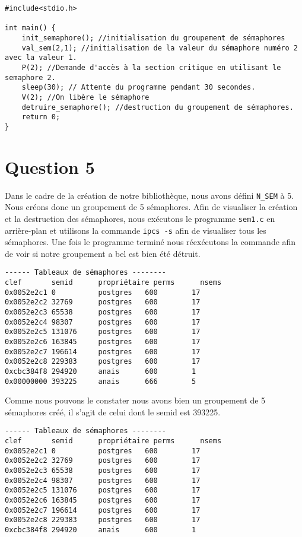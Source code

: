 \begin{lstlisting}
#include<stdio.h>

int main() {
    init_semaphore(); //initialisation du groupement de sémaphores
    val_sem(2,1); //initialisation de la valeur du sémaphore numéro 2 avec la valeur 1.
    P(2); //Demande d'accès à la section critique en utilisant le semaphore 2.
    sleep(30); // Attente du programme pendant 30 secondes.
    V(2); //On libère le sémaphore
    detruire_semaphore(); //destruction du groupement de sémaphores.
    return 0;
}
\end{lstlisting}

\section{Question 5}
Dans le cadre de la création de notre bibliothèque, nous avons défini \lstinline{N_SEM} à 5. Nous créons donc un groupement de 5 sémaphores. Afin de visualiser la création et la destruction des sémaphores, nous exécutons le programme \lstinline{sem1.c} en arrière-plan et utilisons la commande \lstinline{ipcs -s} afin de visualiser tous les sémaphores. Une fois le programme terminé nous réexécutons la commande afin de voir si notre groupement a bel est bien été détruit.

\begin{lstlisting}
------ Tableaux de sémaphores --------
clef       semid      propriétaire perms      nsems     
0x0052e2c1 0          postgres   600        17        
0x0052e2c2 32769      postgres   600        17        
0x0052e2c3 65538      postgres   600        17        
0x0052e2c4 98307      postgres   600        17        
0x0052e2c5 131076     postgres   600        17        
0x0052e2c6 163845     postgres   600        17        
0x0052e2c7 196614     postgres   600        17        
0x0052e2c8 229383     postgres   600        17        
0xcbc384f8 294920     anais      600        1         
0x00000000 393225     anais      666        5 
\end{lstlisting}

Comme nous pouvons le constater nous avons bien un groupement de 5 sémaphores créé, il s'agit de celui dont le semid est 393225.

\begin{lstlisting}
------ Tableaux de sémaphores --------
clef       semid      propriétaire perms      nsems     
0x0052e2c1 0          postgres   600        17        
0x0052e2c2 32769      postgres   600        17        
0x0052e2c3 65538      postgres   600        17        
0x0052e2c4 98307      postgres   600        17        
0x0052e2c5 131076     postgres   600        17        
0x0052e2c6 163845     postgres   600        17        
0x0052e2c7 196614     postgres   600        17        
0x0052e2c8 229383     postgres   600        17        
0xcbc384f8 294920     anais      600        1 
\end{lstlisting} 

